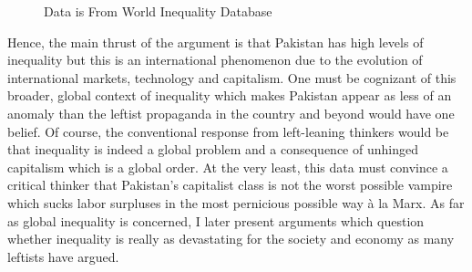 \documentclass[12pt]{article}
\newcommand{\1}{\mathbbm 1}
\begin{document}
	\begin{figure}[H]
	\centering
	\scalebox{0.6}{}
	\hfill
	\caption{Data is From World Inequality Database}
\end{figure}
	
	
	
	
	
	
Hence, the main thrust of the argument is that Pakistan has high levels of inequality but this is an international phenomenon due to the evolution of international markets, technology and capitalism. One must be cognizant of this broader, global context of inequality which makes Pakistan appear as less of an anomaly than the leftist propaganda in the country and beyond would have one belief. Of course, the conventional response from left-leaning thinkers would be that inequality is indeed a global problem and a consequence of unhinged capitalism which is a global order. At the very least, this data must convince a critical thinker that Pakistan's capitalist class is not the worst possible vampire which sucks labor surpluses in the most pernicious possible way \`a la Marx. As far as global inequality is concerned, I later present arguments which question whether inequality is really as devastating for the society and economy as many leftists have argued.
		
		
		
		
		
		
		
		
		
	
		
		
\end{document}
